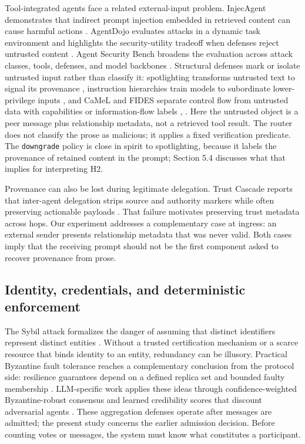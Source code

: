 \documentclass[11pt]{article}
\begin{document}
Tool-integrated agents face a related external-input problem. InjecAgent demonstrates that indirect prompt injection embedded in retrieved content can cause harmful actions \cite{zhan2024injecagent}. AgentDojo evaluates attacks in a dynamic task environment and highlights the security-utility tradeoff when defenses reject untrusted content \cite{debenedetti2024agentdojo}. Agent Security Bench broadens the evaluation across attack classes, tools, defenses, and model backbones \cite{zhang2025asb}. Structural defenses mark or isolate untrusted input rather than classify it: spotlighting transforms untrusted text to signal its provenance \cite{hines2024spotlighting}, instruction hierarchies train models to subordinate lower-privilege inputs \cite{wallace2024hierarchy}, and CaMeL and FIDES separate control flow from untrusted data with capabilities or information-flow labels \cite{debenedetti2025camel}, \cite{costa2025fides}. Here the untrusted object is a peer message plus relationship metadata, not a retrieved tool result. The router does not classify the prose as malicious; it applies a fixed verification predicate. The \texttt{downgrade} policy is close in spirit to spotlighting, because it labels the provenance of retained content in the prompt; Section 5.4 discusses what that implies for interpreting H2.

Provenance can also be lost during legitimate delegation. Trust Cascade reports that inter-agent delegation strips source and authority markers while often preserving actionable payloads \cite{zhou2026trustcascade}. That failure motivates preserving trust metadata across hops. Our experiment addresses a complementary case at ingress: an external sender presents relationship metadata that was never valid. Both cases imply that the receiving prompt should not be the first component asked to recover provenance from prose.

\subsection{Identity, credentials, and deterministic enforcement}

The Sybil attack formalizes the danger of assuming that distinct identifiers represent distinct entities \cite{douceur2002sybil}. Without a trusted certification mechanism or a scarce resource that binds identity to an entity, redundancy can be illusory. Practical Byzantine fault tolerance reaches a complementary conclusion from the protocol side: resilience guarantees depend on a defined replica set and bounded faulty membership \cite{castro1999pbft}. LLM-specific work applies these ideas through confidence-weighted Byzantine-robust consensus \cite{zheng2025byzantine} and learned credibility scores that discount adversarial agents \cite{ebrahimi2025credibility}. These aggregation defenses operate after messages are admitted; the present study concerns the earlier admission decision. Before counting votes or messages, the system must know what constitutes a participant.
\end{document}
